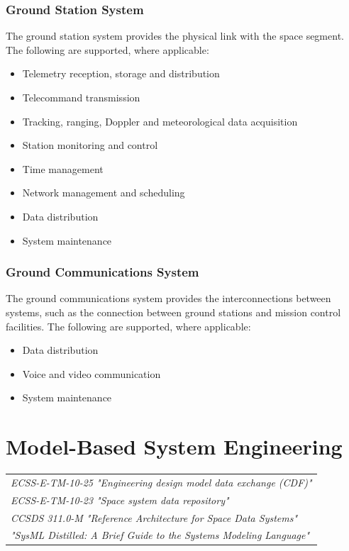 \subsubsection{Ground Station System}

The ground station system provides the physical link with the space segment. The following are supported, where applicable:

\begin{itemize}
\item Telemetry reception, storage and distribution
\item Telecommand transmission
\item Tracking, ranging, Doppler and meteorological data acquisition
\item Station monitoring and control
\item Time management
\item Network management and scheduling
\item Data distribution
\item System maintenance
\end{itemize}

\subsubsection{Ground Communications System}

The ground communications system provides the interconnections between systems, such as the connection between ground stations and mission control facilities. The following are supported, where applicable:

\begin{itemize}
\item Data distribution
\item Voice and video communication
\item System maintenance
\end{itemize}

\section{Model-Based System Engineering}

\begin{tabular}{l}
\textit{ECSS-E-TM-10-25 "Engineering design model data exchange (CDF)" \cite{ECSS-E-TM-10-25}} \\
\textit{ECSS-E-TM-10-23 "Space system data repository" \cite{ECSS-E-TM-10-23}} \\
\textit{CCSDS 311.0-M "Reference Architecture for Space Data Systems" \cite{CCSDS-311.0-M}} \\
\textit{"SysML Distilled: A Brief Guide to the Systems Modeling Language" \cite{delligatti2014sysml}}
\end{tabular}

